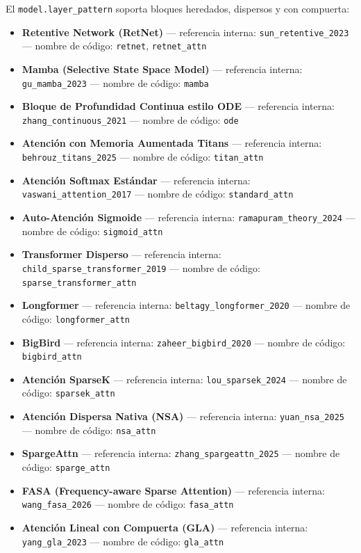 El \texttt{model.layer\_pattern} soporta bloques heredados, dispersos y con compuerta:
\begin{itemize}[leftmargin=*]
    \item \textbf{Retentive Network (RetNet)} --- referencia interna: \texttt{sun\_retentive\_2023} --- nombre de código: \texttt{retnet}, \texttt{retnet\_attn}
    \item \textbf{Mamba (Selective State Space Model)} --- referencia interna: \texttt{gu\_mamba\_2023} --- nombre de código: \texttt{mamba}
    \item \textbf{Bloque de Profundidad Continua estilo ODE} --- referencia interna: \texttt{zhang\_continuous\_2021} --- nombre de código: \texttt{ode}
    \item \textbf{Atención con Memoria Aumentada Titans} --- referencia interna: \texttt{behrouz\_titans\_2025} --- nombre de código: \texttt{titan\_attn}
    \item \textbf{Atención Softmax Estándar} --- referencia interna: \texttt{vaswani\_attention\_2017} --- nombre de código: \texttt{standard\_attn}
    \item \textbf{Auto-Atención Sigmoide} --- referencia interna: \texttt{ramapuram\_theory\_2024} --- nombre de código: \texttt{sigmoid\_attn}
    \item \textbf{Transformer Disperso} --- referencia interna: \texttt{child\_sparse\_transformer\_2019} --- nombre de código: \texttt{sparse\_transformer\_attn}
    \item \textbf{Longformer} --- referencia interna: \texttt{beltagy\_longformer\_2020} --- nombre de código: \texttt{longformer\_attn}
    \item \textbf{BigBird} --- referencia interna: \texttt{zaheer\_bigbird\_2020} --- nombre de código: \texttt{bigbird\_attn}
    \item \textbf{Atención SparseK} --- referencia interna: \texttt{lou\_sparsek\_2024} --- nombre de código: \texttt{sparsek\_attn}
    \item \textbf{Atención Dispersa Nativa (NSA)} --- referencia interna: \texttt{yuan\_nsa\_2025} --- nombre de código: \texttt{nsa\_attn}
    \item \textbf{SpargeAttn} --- referencia interna: \texttt{zhang\_spargeattn\_2025} --- nombre de código: \texttt{sparge\_attn}
    \item \textbf{FASA (Frequency-aware Sparse Attention)} --- referencia interna: \texttt{wang\_fasa\_2026} --- nombre de código: \texttt{fasa\_attn}
    \item \textbf{Atención Lineal con Compuerta (GLA)} --- referencia interna: \texttt{yang\_gla\_2023} --- nombre de código: \texttt{gla\_attn}

\end{itemize}
